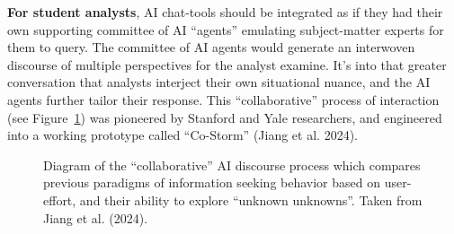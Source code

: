 \documentclass[
]{article}
\begin{document}
\textbf{For student analysts}, AI chat-tools should be integrated as if
they had their own supporting committee of AI ``agents'' emulating
subject-matter experts for them to query. The committee of AI agents
would generate an interwoven discourse of multiple perspectives for the
analyst examine. It's into that greater conversation that analysts
interject their own situational nuance, and the AI agents further tailor
their response. This ``collaborative'' process of interaction (see
Figure~\ref{fig-r-jiang-costorm}) was pioneered by Stanford and Yale
researchers, and engineered into a working prototype called ``Co-Storm''
(Jiang et al. 2024).

\begin{figure}


\caption{\label{fig-r-jiang-costorm}Diagram of the ``collaborative'' AI
discourse process which compares previous paradigms of information
seeking behavior based on user-effort, and their ability to explore
``unknown unknowns''. Taken from Jiang et al. (2024).}

\end{figure}%
\end{document}
